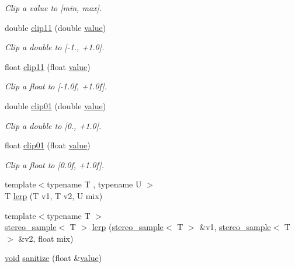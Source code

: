 \begin{DoxyCompactItemize}
\begin{DoxyCompactList}\small\item\em Clip a value to \mbox{[}min, max\mbox{]}. \end{DoxyCompactList}\item 
double \hyperlink{namespacedsp_a95c518d4027020f85f8395f7f33e4892}{clip11} (double \hyperlink{tk_8h_a177a0765f574ef6642002696d9cd82d0}{value})
\begin{DoxyCompactList}\small\item\em Clip a double to \mbox{[}-\/1., +1.0\mbox{]}. \end{DoxyCompactList}\item 
float \hyperlink{namespacedsp_a6ae773f4c7dca3081520aacbdcc5214f}{clip11} (float \hyperlink{tk_8h_a177a0765f574ef6642002696d9cd82d0}{value})
\begin{DoxyCompactList}\small\item\em Clip a float to \mbox{[}-\/1.\+0f, +1.0f\mbox{]}. \end{DoxyCompactList}\item 
double \hyperlink{namespacedsp_a012aa942a767c4571c1c136a18377f28}{clip01} (double \hyperlink{tk_8h_a177a0765f574ef6642002696d9cd82d0}{value})
\begin{DoxyCompactList}\small\item\em Clip a double to \mbox{[}0., +1.0\mbox{]}. \end{DoxyCompactList}\item 
float \hyperlink{namespacedsp_a8a58ff00b0b864fffad01ecac5257b18}{clip01} (float \hyperlink{tk_8h_a177a0765f574ef6642002696d9cd82d0}{value})
\begin{DoxyCompactList}\small\item\em Clip a float to \mbox{[}0.\+0f, +1.0f\mbox{]}. \end{DoxyCompactList}\item 
{\footnotesize template$<$typename T , typename U $>$ }\\T \hyperlink{namespacedsp_a39d5fa90621bd9b344c10b81d317b828}{lerp} (T v1, T v2, U mix)
\item 
{\footnotesize template$<$typename T $>$ }\\\hyperlink{structdsp_1_1stereo__sample}{stereo\+\_\+sample}$<$ T $>$ \hyperlink{namespacedsp_ac22836f63065399a64ba3055aff46589}{lerp} (\hyperlink{structdsp_1_1stereo__sample}{stereo\+\_\+sample}$<$ T $>$ \&v1, \hyperlink{structdsp_1_1stereo__sample}{stereo\+\_\+sample}$<$ T $>$ \&v2, float mix)
\item 
\hyperlink{tk_8h_aba408b7cd755a96426e004c015f5de8e}{void} \hyperlink{namespacedsp_aaafcf4f2177c8673092dbfe99b2febb7}{sanitize} (float \&\hyperlink{tk_8h_a177a0765f574ef6642002696d9cd82d0}{value})

\end{DoxyCompactItemize}

